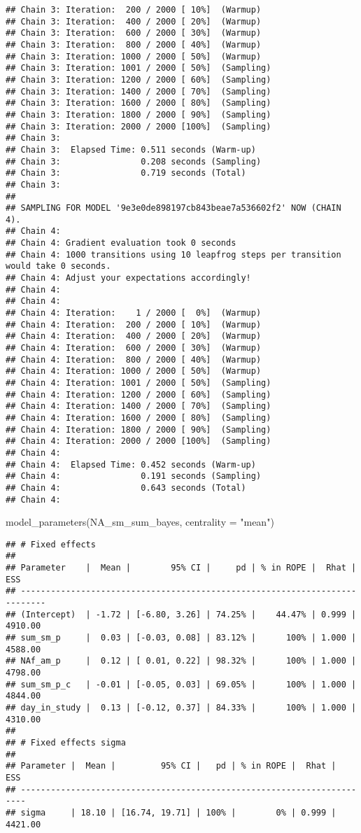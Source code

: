 \documentclass[
]{article}
\newenvironment{Shaded}{\begin{snugshade}}{\end{snugshade}}
\newcommand{\AttributeTok}[1]{\textcolor[rgb]{0.77,0.63,0.00}{#1}}
\newcommand{\FunctionTok}[1]{\textcolor[rgb]{0.00,0.00,0.00}{#1}}
\newcommand{\NormalTok}[1]{#1}
\newcommand{\StringTok}[1]{\textcolor[rgb]{0.31,0.60,0.02}{#1}}
\begin{document}
\begin{verbatim}
## Chain 3: Iteration:  200 / 2000 [ 10%]  (Warmup)
## Chain 3: Iteration:  400 / 2000 [ 20%]  (Warmup)
## Chain 3: Iteration:  600 / 2000 [ 30%]  (Warmup)
## Chain 3: Iteration:  800 / 2000 [ 40%]  (Warmup)
## Chain 3: Iteration: 1000 / 2000 [ 50%]  (Warmup)
## Chain 3: Iteration: 1001 / 2000 [ 50%]  (Sampling)
## Chain 3: Iteration: 1200 / 2000 [ 60%]  (Sampling)
## Chain 3: Iteration: 1400 / 2000 [ 70%]  (Sampling)
## Chain 3: Iteration: 1600 / 2000 [ 80%]  (Sampling)
## Chain 3: Iteration: 1800 / 2000 [ 90%]  (Sampling)
## Chain 3: Iteration: 2000 / 2000 [100%]  (Sampling)
## Chain 3: 
## Chain 3:  Elapsed Time: 0.511 seconds (Warm-up)
## Chain 3:                0.208 seconds (Sampling)
## Chain 3:                0.719 seconds (Total)
## Chain 3: 
## 
## SAMPLING FOR MODEL '9e3e0de898197cb843beae7a536602f2' NOW (CHAIN 4).
## Chain 4: 
## Chain 4: Gradient evaluation took 0 seconds
## Chain 4: 1000 transitions using 10 leapfrog steps per transition would take 0 seconds.
## Chain 4: Adjust your expectations accordingly!
## Chain 4: 
## Chain 4: 
## Chain 4: Iteration:    1 / 2000 [  0%]  (Warmup)
## Chain 4: Iteration:  200 / 2000 [ 10%]  (Warmup)
## Chain 4: Iteration:  400 / 2000 [ 20%]  (Warmup)
## Chain 4: Iteration:  600 / 2000 [ 30%]  (Warmup)
## Chain 4: Iteration:  800 / 2000 [ 40%]  (Warmup)
## Chain 4: Iteration: 1000 / 2000 [ 50%]  (Warmup)
## Chain 4: Iteration: 1001 / 2000 [ 50%]  (Sampling)
## Chain 4: Iteration: 1200 / 2000 [ 60%]  (Sampling)
## Chain 4: Iteration: 1400 / 2000 [ 70%]  (Sampling)
## Chain 4: Iteration: 1600 / 2000 [ 80%]  (Sampling)
## Chain 4: Iteration: 1800 / 2000 [ 90%]  (Sampling)
## Chain 4: Iteration: 2000 / 2000 [100%]  (Sampling)
## Chain 4: 
## Chain 4:  Elapsed Time: 0.452 seconds (Warm-up)
## Chain 4:                0.191 seconds (Sampling)
## Chain 4:                0.643 seconds (Total)
## Chain 4:
\end{verbatim}

\begin{Shaded}
\begin{Highlighting}[]
\FunctionTok{model\_parameters}\NormalTok{(NA\_sm\_sum\_bayes, }\AttributeTok{centrality =} \StringTok{"mean"}\NormalTok{)}
\end{Highlighting}
\end{Shaded}

\begin{verbatim}
## # Fixed effects
## 
## Parameter    |  Mean |        95% CI |     pd | % in ROPE |  Rhat |     ESS
## ---------------------------------------------------------------------------
## (Intercept)  | -1.72 | [-6.80, 3.26] | 74.25% |    44.47% | 0.999 | 4910.00
## sum_sm_p     |  0.03 | [-0.03, 0.08] | 83.12% |      100% | 1.000 | 4588.00
## NAf_am_p     |  0.12 | [ 0.01, 0.22] | 98.32% |      100% | 1.000 | 4798.00
## sum_sm_p_c   | -0.01 | [-0.05, 0.03] | 69.05% |      100% | 1.000 | 4844.00
## day_in_study |  0.13 | [-0.12, 0.37] | 84.33% |      100% | 1.000 | 4310.00
## 
## # Fixed effects sigma
## 
## Parameter |  Mean |         95% CI |   pd | % in ROPE |  Rhat |     ESS
## -----------------------------------------------------------------------
## sigma     | 18.10 | [16.74, 19.71] | 100% |        0% | 0.999 | 4421.00
\end{verbatim}
\end{document}
